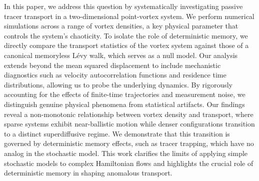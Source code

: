 \documentclass[]{article}
\begin{document}
In this paper, we address this question by systematically investigating passive tracer transport in a two-dimensional point-vortex system. We perform numerical simulations across a range of vortex densities, a key physical parameter that controls the system's chaoticity. To isolate the role of deterministic memory, we directly compare the transport statistics of the vortex system against those of a canonical memoryless Lévy walk, which serves as a null model. Our analysis extends beyond the mean squared displacement to include mechanistic diagnostics such as velocity autocorrelation functions and residence time distributions, allowing us to probe the underlying dynamics. By rigorously accounting for the effects of finite-time trajectories and measurement noise, we distinguish genuine physical phenomena from statistical artifacts. Our findings reveal a non-monotonic relationship between vortex density and transport, where sparse systems exhibit near-ballistic motion while denser configurations transition to a distinct superdiffusive regime. We demonstrate that this transition is governed by deterministic memory effects, such as tracer trapping, which have no analog in the stochastic model. This work clarifies the limits of applying simple stochastic models to complex Hamiltonian flows and highlights the crucial role of deterministic memory in shaping anomalous transport.
\end{document}

